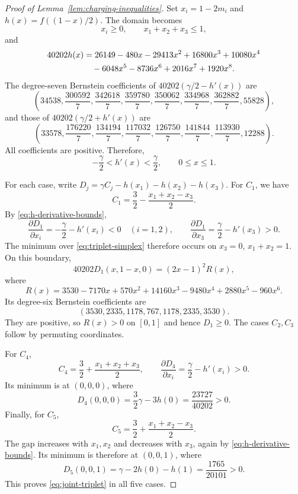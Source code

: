 \documentclass[11pt]{article}
\theoremstyle{definition}
\theoremstyle{remark}
\newcommand{\1}{\mathbf{1}}
\begin{document}
\begin{proof}[Proof of Lemma~\ref{lem:charging-inequalities}]
Set $x_i=1-2m_i$ and $h(x)=f((1-x)/2)$. The domain becomes
\begin{equation}
    x_i\geq0,\qquad x_1+x_2+x_3\leq1,
    \label{eq:triplet-simplex}
\end{equation}
and
\begin{align}
    40202h(x)
        &=26149-480x-29413x^2+16800x^3+10080x^4\notag\\
        &\quad-6048x^5-8736x^6+2016x^7+1920x^8.
    \label{eq:h-polynomial}
\end{align}
The degree-seven Bernstein coefficients of
$40202(\gamma/2-h'(x))$ are
\[
    \left(34538,\frac{300592}{7},\frac{342618}{7},
        \frac{359780}{7},\frac{350062}{7},
        \frac{334968}{7},\frac{362882}{7},55828\right),
\]
and those of $40202(\gamma/2+h'(x))$ are
\[
    \left(33578,\frac{176220}{7},\frac{134194}{7},
        \frac{117032}{7},\frac{126750}{7},
        \frac{141844}{7},\frac{113930}{7},12288\right).
\]
All coefficients are positive. Therefore,
\begin{equation}
    -\frac\gamma2<h'(x)<\frac\gamma2,
    \qquad 0\leq x\leq1.
    \label{eq:h-derivative-bounds}
\end{equation}

For each case, write
$D_j=\gamma C_j-h(x_1)-h(x_2)-h(x_3)$.
For $C_1$, we have
\[
    C_1=\frac32-\frac{x_1+x_2-x_3}{2}.
\]
By \eqref{eq:h-derivative-bounds},
\[
    \frac{\partial D_1}{\partial x_i}
        =-\frac\gamma2-h'(x_i)<0\quad(i=1,2),
    \qquad
    \frac{\partial D_1}{\partial x_3}
        =\frac\gamma2-h'(x_3)>0.
\]
The minimum over \eqref{eq:triplet-simplex} therefore occurs
on $x_3=0$, $x_1+x_2=1$. On this boundary,
\[
    40202D_1(x,1-x,0)=(2x-1)^2R(x),
\]
where
\[
    R(x)=3530-7170x+570x^2+14160x^3
        -9480x^4+2880x^5-960x^6.
\]
Its degree-six Bernstein coefficients are
\[
    (3530,2335,1178,767,1178,2335,3530).
\]
They are positive, so $R(x)>0$ on $[0,1]$ and hence $D_1\geq0$.
The cases $C_2,C_3$ follow by permuting coordinates.

For $C_4$,
\[
    C_4=\frac32+\frac{x_1+x_2+x_3}{2},
    \qquad
    \frac{\partial D_4}{\partial x_i}
        =\frac\gamma2-h'(x_i)>0.
\]
Its minimum is at $(0,0,0)$, where
\[
    D_4(0,0,0)=\frac32\gamma-3h(0)
        =\frac{23727}{40202}>0.
\]
Finally, for $C_5$,
\[
    C_5=\frac32+\frac{x_1+x_2-x_3}{2}.
\]
The gap increases with $x_1,x_2$ and decreases with $x_3$,
again by \eqref{eq:h-derivative-bounds}. Its minimum is
therefore at $(0,0,1)$, where
\[
    D_5(0,0,1)=\gamma-2h(0)-h(1)
        =\frac{1765}{20101}>0.
\]
This proves \eqref{eq:joint-triplet} in all five cases.
\end{proof}


\end{document}
